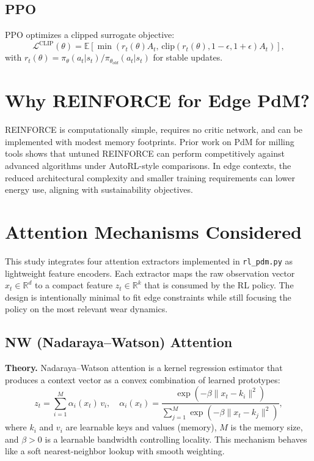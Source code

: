 \documentclass[11pt]{article}
\begin{document}
\subsection{PPO}
PPO optimizes a clipped surrogate objective:
\begin{equation}
\mathcal{L}^{\text{CLIP}}(\theta) = \mathbb{E}\left[\min\left(r_t(\theta)A_t,\, \text{clip}(r_t(\theta),1-\epsilon,1+\epsilon)A_t\right)\right],
\end{equation}
with $r_t(\theta)=\pi_\theta(a_t|s_t)/\pi_{\theta_{old}}(a_t|s_t)$ for stable updates. \cite{Schulman2017PPO}

\section{Why REINFORCE for Edge PdM?}
REINFORCE is computationally simple, requires no critic network, and can be implemented with modest memory footprints. Prior work on PdM for milling tools shows that untuned REINFORCE can perform competitively against advanced algorithms under AutoRL-style comparisons. \cite{Siraskar2025REINFORCE} In edge contexts, the reduced architectural complexity and smaller training requirements can lower energy use, aligning with sustainability objectives. \cite{Strubell2019EnergyPolicy,Patterson2021Carbon}

\section{Attention Mechanisms Considered}
This study integrates four attention extractors implemented in \texttt{rl\_pdm.py} as lightweight feature encoders. Each extractor maps the raw observation vector $x_t \in \mathbb{R}^{d}$ to a compact feature $z_t \in \mathbb{R}^{k}$ that is consumed by the RL policy. The design is intentionally minimal to fit edge constraints while still focusing the policy on the most relevant wear dynamics.

\subsection{NW (Nadaraya--Watson) Attention}
\textbf{Theory.} Nadaraya--Watson attention is a kernel regression estimator that produces a context vector as a convex combination of learned prototypes:
\begin{equation}
z_t = \sum_{i=1}^{M} \alpha_i(x_t)\, v_i, \quad
\alpha_i(x_t) = \frac{\exp(-\beta \lVert x_t - k_i\rVert^2)}{\sum_{j=1}^{M} \exp(-\beta \lVert x_t - k_j\rVert^2)},
\end{equation}
where $k_i$ and $v_i$ are learnable keys and values (memory), $M$ is the memory size, and $\beta>0$ is a learnable bandwidth controlling locality. This mechanism behaves like a soft nearest-neighbor lookup with smooth weighting. \cite{Siraskar2024NW}
\end{document}
